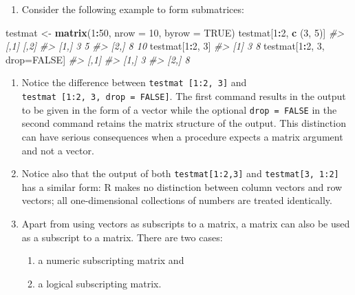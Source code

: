 \documentclass[
]{book}
\newenvironment{Shaded}{\begin{snugshade}}{\end{snugshade}}
\newcommand{\AttributeTok}[1]{\textcolor[rgb]{0.13,0.29,0.53}{#1}}
\newcommand{\CommentTok}[1]{\textcolor[rgb]{0.56,0.35,0.01}{\textit{#1}}}
\newcommand{\ConstantTok}[1]{\textcolor[rgb]{0.56,0.35,0.01}{#1}}
\newcommand{\DecValTok}[1]{\textcolor[rgb]{0.00,0.00,0.81}{#1}}
\newcommand{\FunctionTok}[1]{\textcolor[rgb]{0.13,0.29,0.53}{\textbf{#1}}}
\newcommand{\NormalTok}[1]{#1}
\newcommand{\OtherTok}[1]{\textcolor[rgb]{0.56,0.35,0.01}{#1}}
\newcommand{\SpecialCharTok}[1]{\textcolor[rgb]{0.81,0.36,0.00}{\textbf{#1}}}
\providecommand{\tightlist}{%
  \setlength{\itemsep}{0pt}\setlength{\parskip}{0pt}}
\begin{document}
\begin{enumerate}
\def\labelenumi{(\alph{enumi})}
\setcounter{enumi}{6}
\tightlist
\item
  Consider the following example to form submatrices:
\end{enumerate}

\begin{Shaded}
\begin{Highlighting}[]
\NormalTok{testmat }\OtherTok{\textless{}{-}} \FunctionTok{matrix}\NormalTok{(}\DecValTok{1}\SpecialCharTok{:}\DecValTok{50}\NormalTok{, }\AttributeTok{nrow =} \DecValTok{10}\NormalTok{, }\AttributeTok{byrow =} \ConstantTok{TRUE}\NormalTok{)}
\NormalTok{testmat[}\DecValTok{1}\SpecialCharTok{:}\DecValTok{2}\NormalTok{, }\FunctionTok{c}\NormalTok{ (}\DecValTok{3}\NormalTok{, }\DecValTok{5}\NormalTok{)]}
\CommentTok{\#\textgreater{}      [,1] [,2]}
\CommentTok{\#\textgreater{} [1,]    3    5}
\CommentTok{\#\textgreater{} [2,]    8   10}
\NormalTok{testmat[}\DecValTok{1}\SpecialCharTok{:}\DecValTok{2}\NormalTok{, }\DecValTok{3}\NormalTok{]}
\CommentTok{\#\textgreater{} [1] 3 8}
\NormalTok{testmat[}\DecValTok{1}\SpecialCharTok{:}\DecValTok{2}\NormalTok{, }\DecValTok{3}\NormalTok{, drop}\OtherTok{=}\ConstantTok{FALSE}\NormalTok{]}
\CommentTok{\#\textgreater{}      [,1]}
\CommentTok{\#\textgreater{} [1,]    3}
\CommentTok{\#\textgreater{} [2,]    8}
\end{Highlighting}
\end{Shaded}

\begin{enumerate}
\def\labelenumi{(\alph{enumi})}
\setcounter{enumi}{7}
\item
  Notice the difference between \texttt{testmat\ {[}1:2,\ 3{]}} and \texttt{testmat\ {[}1:2,\ 3,\ drop\ =\ FALSE{]}}. The first command results in the output to be given in the form of a vector while the optional \texttt{drop\ =\ FALSE} in the second command retains the matrix structure of the output. This distinction can have serious consequences when a procedure expects a matrix argument and not a vector.
\item
  Notice also that the output of both \texttt{testmat{[}1:2,3{]}} and \texttt{testmat{[}3,\ 1:2{]}} has a similar form: R makes no distinction between column vectors and row vectors; all one-dimensional collections of numbers are treated identically.
\item
  Apart from using vectors as subscripts to a matrix, a matrix can also be used as a subscript to a matrix. There are two cases:

  \begin{enumerate}
  \def\labelenumii{(\Alph{enumii})}
  \tightlist
  \item
    a numeric subscripting matrix and
  \item
    a logical subscripting matrix.
  \end{enumerate}
\end{enumerate}
\end{document}
